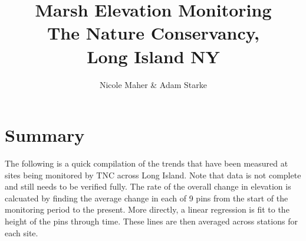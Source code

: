 \documentclass{article}\usepackage[]{graphicx}\usepackage[]{color}
\begin{document}
\title{Marsh Elevation Monitoring\\
The Nature Conservancy, \\
Long Island NY}
\author{Nicole Maher \& Adam Starke}
\maketitle\thispagestyle{empty}

\section{Summary}




The following is a quick compilation of the trends that have been measured at sites being monitored by TNC across Long Island. Note that data is not complete and still needs to be verified fully. The rate of the overall change in elevation is calcuated by finding the average change in each of 9 pins from the start of the monitoring period to the present. More directly, a linear regression is fit to the height of the pins through time. These lines are then averaged across stations for each site. 
\end{document}
